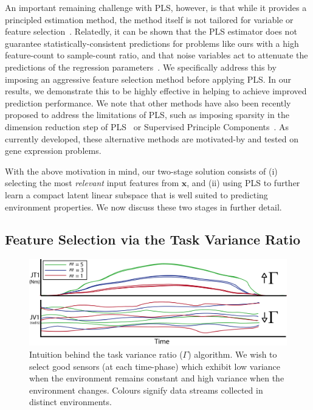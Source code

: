 An important remaining challenge with PLS, however, is that while it provides a principled          estimation method, the method itself is not tailored for variable or feature                        selection~\cite{chun2010sparse}. Relatedly, it can be shown that the PLS estimator does not         guarantee statistically-consistent predictions for problems like ours with a high feature-count to  sample-count ratio, and that noise variables act to attenuate the predictions of the regression     parameters~\cite{chun2010sparse}. 
We specifically address this by imposing an aggressive feature selection method before applying PLS.
In our results, we demonstrate this to be highly effective in helping to achieve improved           prediction performance.
We note that other methods have also been recently proposed to address the limitations of PLS, such as imposing sparsity in the dimension reduction step of PLS~\cite{chun2010sparse} or Supervised     Principle Components~\cite{bair2006prediction}.
As currently developed, these alternative methods are motivated-by and tested on gene expression    problems.


With the above motivation in mind, our two-stage solution consists of (i) selecting the most {\em   relevant} input features from $\mathbf{x}$, and (ii) using PLS to further learn a compact latent    linear subspace that is well suited to predicting environment properties.
We now discuss these two stages in further detail.

\subsection{Feature Selection via the Task Variance Ratio}
\label{sec:feature_selection}

\begin{figure}[tb]
  \centering
  \includegraphics[width=\linewidth]{images/TVR_intuition}
  \caption{Intuition behind the task variance ratio ($\Gamma$) algorithm. We wish to select good sensors (at each time-phase) which exhibit low variance when the environment remains constant and high variance when the environment changes. Colours signify data streams collected in distinct environments.}
  \label{fig:TVR_intuition}
\end{figure}

